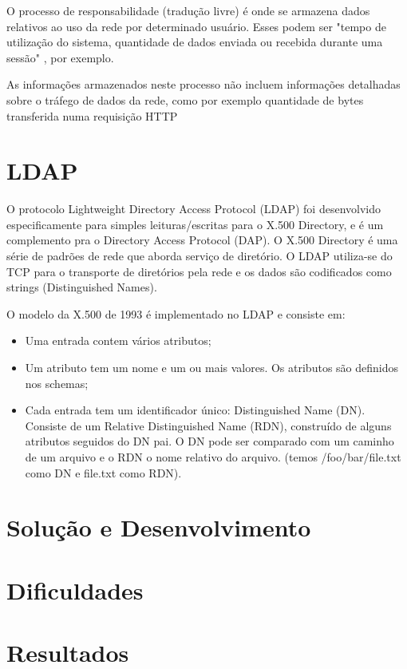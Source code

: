 O processo de responsabilidade (tradução livre) é onde se armazena dados relativos
ao uso da rede por determinado usuário. Esses podem ser "tempo de utilização do sistema,
quantidade de dados enviada ou recebida durante uma sessão" \cite{radius-guide}, por exemplo.

As informações armazenados neste processo não incluem informações detalhadas sobre o tráfego
de dados da rede, como por exemplo quantidade de bytes transferida numa requisição HTTP \cite{radius-guide}


\section{LDAP}

O protocolo Lightweight Directory Access Protocol (LDAP) foi desenvolvido especificamente
para simples leituras/escritas para o X.500 Directory, e é um complemento pra o Directory
Access Protocol (DAP). O X.500 Directory é uma série de padrões de rede que aborda serviço
de diretório. O LDAP utiliza-se do TCP para o transporte de diretórios pela rede e os dados
são codificados como strings (Distinguished Names).

O modelo da X.500 de 1993 é implementado no LDAP e consiste em:
\begin{itemize}
  \item Uma entrada contem vários atributos;
  \item Um atributo tem um nome e um ou mais valores. Os atributos são definidos nos schemas;
  \item Cada entrada tem um identificador único: Distinguished Name (DN). Consiste de um
    Relative Distinguished Name (RDN), construído de alguns atributos seguidos do DN pai.
    O DN pode ser comparado com um caminho de um arquivo e o RDN o nome relativo do arquivo.
    (temos /foo/bar/file.txt como DN e file.txt como RDN).
\end{itemize}

\section{Solução e Desenvolvimento}

\section{Dificuldades}

\section{Resultados}

